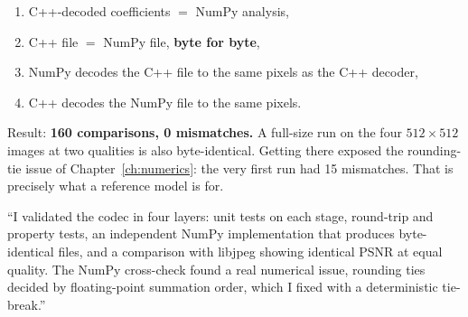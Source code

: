 \begin{enumerate}
\item C++-decoded coefficients $=$ NumPy analysis,
\item C++ file $=$ NumPy file, \textbf{byte for byte},
\item NumPy decodes the C++ file to the same pixels as the C++ decoder,
\item C++ decodes the NumPy file to the same pixels.
\end{enumerate}

Result: \textbf{160 comparisons, 0 mismatches.} A full-size run on the four $512\times512$ images at two qualities is also byte-identical. Getting there exposed the rounding-tie issue of Chapter~\ref{ch:numerics}: the very first run had 15 mismatches. That is precisely what a reference model is for.

\begin{sound}
``I validated the codec in four layers: unit tests on each stage, round-trip and property tests, an independent NumPy implementation that produces byte-identical files, and a comparison with libjpeg showing identical PSNR at equal quality. The NumPy cross-check found a real numerical issue, rounding ties decided by floating-point summation order, which I fixed with a deterministic tie-break.''
\end{sound}

